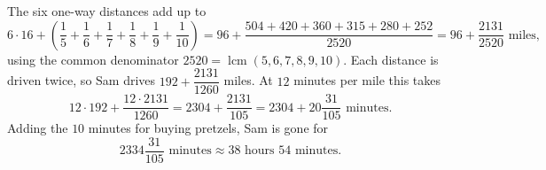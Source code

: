 The six one-way distances add up to
\[6\cdot16+\left(\dfrac15+\dfrac16+\dfrac17+\dfrac18+\dfrac19+\dfrac1{10}\right)=96+\dfrac{504+420+360+315+280+252}{2520}=96+\dfrac{2131}{2520}\text{ miles},\]
using the common denominator $2520=\operatorname{lcm}(5,6,7,8,9,10)$. Each distance is driven twice, so Sam drives $192+\dfrac{2131}{1260}$ miles. At $12$ minutes per mile this takes
\[12\cdot192+\dfrac{12\cdot2131}{1260}=2304+\dfrac{2131}{105}=2304+20\dfrac{31}{105}\text{ minutes}.\]
Adding the $10$ minutes for buying pretzels, Sam is gone for
\[\boxed{2334\dfrac{31}{105}\text{ minutes}}\approx38\text{ hours }54\text{ minutes}.\]
